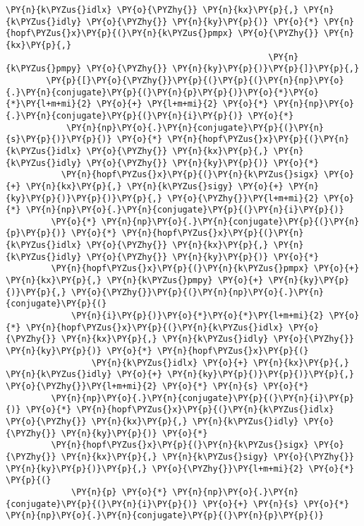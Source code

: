\begin{Verbatim}[commandchars=\\\{\}]
                 \PY{n}{k\PYZus{}idlx} \PY{o}{\PYZhy{}} \PY{n}{kx}\PY{p}{,} \PY{n}{k\PYZus{}idly} \PY{o}{\PYZhy{}} \PY{n}{ky}\PY{p}{)} \PY{o}{*} \PY{n}{hopf\PYZus{}x}\PY{p}{(}\PY{n}{k\PYZus{}pmpx} \PY{o}{\PYZhy{}} \PY{n}{kx}\PY{p}{,}
                                                    \PY{n}{k\PYZus{}pmpy} \PY{o}{\PYZhy{}} \PY{n}{ky}\PY{p}{)}\PY{p}{]}\PY{p}{,}
        \PY{p}{[}\PY{o}{\PYZhy{}}\PY{p}{(}\PY{p}{(}\PY{n}{np}\PY{o}{.}\PY{n}{conjugate}\PY{p}{(}\PY{n}{p}\PY{p}{)}\PY{o}{*}\PY{o}{*}\PY{l+m+mi}{2} \PY{o}{+} \PY{l+m+mi}{2} \PY{o}{*} \PY{n}{np}\PY{o}{.}\PY{n}{conjugate}\PY{p}{(}\PY{n}{i}\PY{p}{)} \PY{o}{*}
            \PY{n}{np}\PY{o}{.}\PY{n}{conjugate}\PY{p}{(}\PY{n}{s}\PY{p}{)}\PY{p}{)} \PY{o}{*} \PY{n}{hopf\PYZus{}x}\PY{p}{(}\PY{n}{k\PYZus{}idlx} \PY{o}{\PYZhy{}} \PY{n}{kx}\PY{p}{,} \PY{n}{k\PYZus{}idly} \PY{o}{\PYZhy{}} \PY{n}{ky}\PY{p}{)} \PY{o}{*}
           \PY{n}{hopf\PYZus{}x}\PY{p}{(}\PY{n}{k\PYZus{}sigx} \PY{o}{+} \PY{n}{kx}\PY{p}{,} \PY{n}{k\PYZus{}sigy} \PY{o}{+} \PY{n}{ky}\PY{p}{)}\PY{p}{)}\PY{p}{,} \PY{o}{\PYZhy{}}\PY{l+m+mi}{2} \PY{o}{*} \PY{n}{np}\PY{o}{.}\PY{n}{conjugate}\PY{p}{(}\PY{n}{i}\PY{p}{)}
         \PY{o}{*} \PY{n}{np}\PY{o}{.}\PY{n}{conjugate}\PY{p}{(}\PY{n}{p}\PY{p}{)} \PY{o}{*} \PY{n}{hopf\PYZus{}x}\PY{p}{(}\PY{n}{k\PYZus{}idlx} \PY{o}{\PYZhy{}} \PY{n}{kx}\PY{p}{,} \PY{n}{k\PYZus{}idly} \PY{o}{\PYZhy{}} \PY{n}{ky}\PY{p}{)} \PY{o}{*}
         \PY{n}{hopf\PYZus{}x}\PY{p}{(}\PY{n}{k\PYZus{}pmpx} \PY{o}{+} \PY{n}{kx}\PY{p}{,} \PY{n}{k\PYZus{}pmpy} \PY{o}{+} \PY{n}{ky}\PY{p}{)}\PY{p}{,} \PY{o}{\PYZhy{}}\PY{p}{(}\PY{n}{np}\PY{o}{.}\PY{n}{conjugate}\PY{p}{(}
             \PY{n}{i}\PY{p}{)}\PY{o}{*}\PY{o}{*}\PY{l+m+mi}{2} \PY{o}{*} \PY{n}{hopf\PYZus{}x}\PY{p}{(}\PY{n}{k\PYZus{}idlx} \PY{o}{\PYZhy{}} \PY{n}{kx}\PY{p}{,} \PY{n}{k\PYZus{}idly} \PY{o}{\PYZhy{}} \PY{n}{ky}\PY{p}{)} \PY{o}{*} \PY{n}{hopf\PYZus{}x}\PY{p}{(}
                 \PY{n}{k\PYZus{}idlx} \PY{o}{+} \PY{n}{kx}\PY{p}{,} \PY{n}{k\PYZus{}idly} \PY{o}{+} \PY{n}{ky}\PY{p}{)}\PY{p}{)}\PY{p}{,} \PY{o}{\PYZhy{}}\PY{l+m+mi}{2} \PY{o}{*} \PY{n}{s} \PY{o}{*}
         \PY{n}{np}\PY{o}{.}\PY{n}{conjugate}\PY{p}{(}\PY{n}{i}\PY{p}{)} \PY{o}{*} \PY{n}{hopf\PYZus{}x}\PY{p}{(}\PY{n}{k\PYZus{}idlx} \PY{o}{\PYZhy{}} \PY{n}{kx}\PY{p}{,} \PY{n}{k\PYZus{}idly} \PY{o}{\PYZhy{}} \PY{n}{ky}\PY{p}{)} \PY{o}{*}
         \PY{n}{hopf\PYZus{}x}\PY{p}{(}\PY{n}{k\PYZus{}sigx} \PY{o}{\PYZhy{}} \PY{n}{kx}\PY{p}{,} \PY{n}{k\PYZus{}sigy} \PY{o}{\PYZhy{}} \PY{n}{ky}\PY{p}{)}\PY{p}{,} \PY{o}{\PYZhy{}}\PY{l+m+mi}{2} \PY{o}{*} \PY{p}{(}
             \PY{n}{p} \PY{o}{*} \PY{n}{np}\PY{o}{.}\PY{n}{conjugate}\PY{p}{(}\PY{n}{i}\PY{p}{)} \PY{o}{+} \PY{n}{s} \PY{o}{*} \PY{n}{np}\PY{o}{.}\PY{n}{conjugate}\PY{p}{(}\PY{n}{p}\PY{p}{)}

\end{Verbatim}
